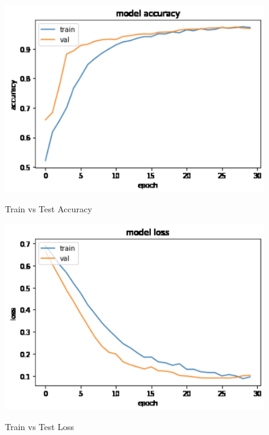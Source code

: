 \documentclass[ 12pt,a4paper,twocolumn,fleqn]{article}
\begin{document}
\begin{adjustwidth}{3.5em}{0pt}
\begin{figure}[H]
\begin{center}
    \hspace*{0.4in}
    \includegraphics[scale=0.7]{media/acc.png}
    \\
  \caption{ Train vs Test Accuracy}
\end{center}
\end{figure}

\hspace{0.2cm}

\begin{figure}[H]
\begin{center}
    \hspace*{0.4in}
    \includegraphics[scale=0.7]{media/loss.png}
    \\
  \caption{ Train vs Test Loss}
\end{center}
\end{figure}


\end{adjustwidth}
\end{document}
